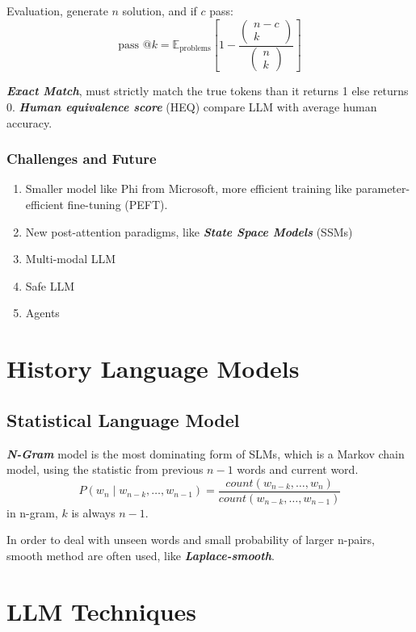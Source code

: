 \documentclass[10pt]{elegantbook}
\newcommand{\mydefination}[1]{\textbf{\textit{\textcolor{structurecolor}{#1}}}}
\begin{document}
Evaluation, generate $n$ solution, and if $c$ pass:
\[ \text{pass @} k = \mathbb E_{\text{problems}} \left [ 1 - \frac{\begin{pmatrix} n-c \\ k \end{pmatrix}}{\begin{pmatrix} n \\ k \end{pmatrix}} \right ] \]

\mydefination{Exact Match}, must strictly match the true tokens than it returns 1 else returns 0. \mydefination{Human equivalence score} (HEQ) compare LLM with 
average human accuracy.

\subsection{Challenges and Future}

\begin{enumerate}
    \item Smaller model like Phi from Microsoft, more efficient training like parameter-efficient fine-tuning (PEFT).
    \item New post-attention paradigms, like \mydefination{State Space Models} (SSMs)
    \item Multi-modal LLM
    \item Safe LLM
    \item Agents
\end{enumerate}

\chapter{History Language Models}

\section{Statistical Language Model}

\mydefination{N-Gram} model is the most dominating form of SLMs, which is a Markov chain model, using the statistic from
previous $n-1$ words and current word.
\[ P(w_n \mid w_{n-k}, \ldots, w_{n-1}) = \frac{count(w_{n-k}, \ldots, w_{n})}{count(w_{n-k}, \ldots, w_{n-1})} \]
in n-gram, $k$ is always $n-1$.

In order to deal with unseen words and small probability of larger n-pairs, smooth method are often used, like 
\mydefination{Laplace-smooth}.

\chapter{LLM Techniques}
\end{document}

